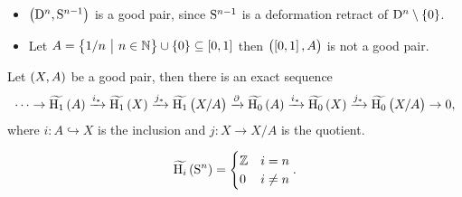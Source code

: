 \begin{example*}
\hfill
\begin{itemize}
\item $ \br{\D^n, \S^{n - 1}} $ is a good pair, since $ \S^{n - 1} $ is a deformation retract of $ \D^n \setminus \cbr{0} $.
\item Let $ A = \cbr{1 / n \st n \in \NN} \cup \cbr{0} \subseteq \sbr{0, 1} $ then $ \br{\sbr{0, 1}, A} $ is not a good pair.
\end{itemize}
\end{example*}

\begin{theorem}
\label{thm:2.13}
Let $ \br{X, A} $ be a good pair, then there is an exact sequence
$$ \dots \to \widetilde{\H_1}\br{A} \xrightarrow{i_*} \widetilde{\H_1}\br{X} \xrightarrow{j_*} \widetilde{\H_1}\br{X / A} \xrightarrow{\partial} \widetilde{\H_0}\br{A} \xrightarrow{i_*} \widetilde{\H_0}\br{X} \xrightarrow{j_*} \widetilde{\H_0}\br{X / A} \to 0, $$
where $ i : A \hookrightarrow X $ is the inclusion and $ j : X \to X / A $ is the quotient.
\end{theorem}

\begin{corollary}
$$ \widetilde{\H_i}\br{\S^n} =
\begin{cases}
\ZZ & i = n \\
0 & i \ne n
\end{cases}.
$$
\end{corollary}

\pagebreak

